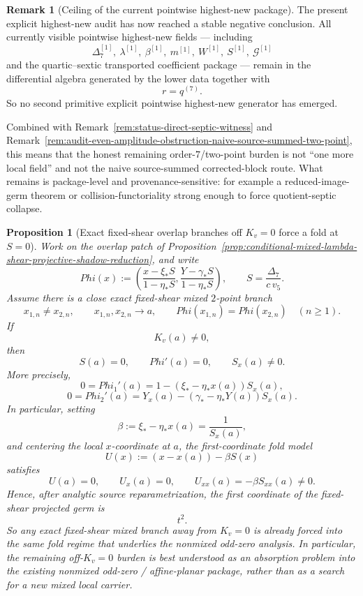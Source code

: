 \documentclass[11pt,a4paper]{amsart}
\def\Phi{Phi}%
\theoremstyle{plain}
\newtheorem{proposition}[theorem]{Proposition}
\theoremstyle{definition}
\newtheorem{remark}[theorem]{Remark}
\begin{document}
\begin{remark}[Ceiling of the current pointwise highest-new package]
\label{rem:ceiling-current-pointwise-highest-new-package}
The present explicit highest-new audit has now reached a stable negative
conclusion. All currently visible pointwise highest-new fields --- including
\[
\Delta_7^{[1]},\ \lambda^{[1]},\ \beta^{[1]},\ m^{[1]},\ W^{[1]},\ S^{[1]},
\ \mathcal G^{[1]}
\]
and the quartic--sextic transported coefficient package --- remain in the
differential algebra generated by the lower data together with
\[
r=q^{(7)}.
\]
So no second primitive explicit pointwise highest-new generator has emerged.

Combined with
Remark~\ref{rem:status-direct-septic-witness}
and
Remark~\ref{rem:audit-even-amplitude-obstruction-naive-source-summed-two-point},
this means that the honest remaining order-$7$/two-point burden is not
``one more local field'' and not the naive source-summed corrected-block route.
What remains is package-level and provenance-sensitive: for example a
reduced-image-germ theorem or collision-functoriality strong enough to force
quotient-septic collapse.
\end{remark}

\begin{proposition}[Exact fixed-shear overlap branches off $K_v=0$ force a fold at $S=0$]
\label{prop:fixed-shear-overlap-branch-off-Kv-forces-fold-at-S-zero}
Work on the overlap patch of
Proposition~\ref{prop:conditional-mixed-lambda-shear-projective-shadow-reduction},
and write
\[
\Phi(x):=
\left(
\frac{x-\xi_* S}{1-\eta_* S},
\frac{Y-\gamma_* S}{1-\eta_* S}
\right),
\qquad
S=\frac{\Delta_7}{c\,v_5}.
\]
Assume there is a close exact fixed-shear mixed $2$-point branch
\[
x_{1,n}\neq x_{2,n},
\qquad
x_{1,n},x_{2,n}\to a,
\qquad
\Phi(x_{1,n})=\Phi(x_{2,n})
\quad(n\ge 1).
\]
If
\[
K_v(a)\neq 0,
\]
then
\[
S(a)=0,
\qquad
\Phi'(a)=0,
\qquad
S_x(a)\neq 0.
\]
More precisely,
\[
0=\Phi_1'(a)=1-(\xi_*-\eta_* x(a))S_x(a),
\]
\[
0=\Phi_2'(a)=Y_x(a)-(\gamma_*-\eta_* Y(a))S_x(a).
\]
In particular, setting
\[
\beta:=\xi_*-\eta_* x(a)=\frac{1}{S_x(a)},
\]
and centering the local $x$-coordinate at $a$, the first-coordinate fold model
\[
U(x):=(x-x(a))-\beta S(x)
\]
satisfies
\[
U(a)=0,
\qquad
U_x(a)=0,
\qquad
U_{xx}(a)=-\beta S_{xx}(a)\neq 0.
\]
Hence, after analytic source reparametrization, the first coordinate of the
fixed-shear projected germ is
\[
t^2.
\]
So any exact fixed-shear mixed branch away from $K_v=0$ is already forced into
the same fold regime that underlies the nonmixed odd-zero analysis. In
particular, the remaining off-$K_v=0$ burden is best understood as an
absorption problem into the existing nonmixed odd-zero / affine-planar package,
rather than as a search for a new mixed local carrier.
\end{proposition}
\end{document}
